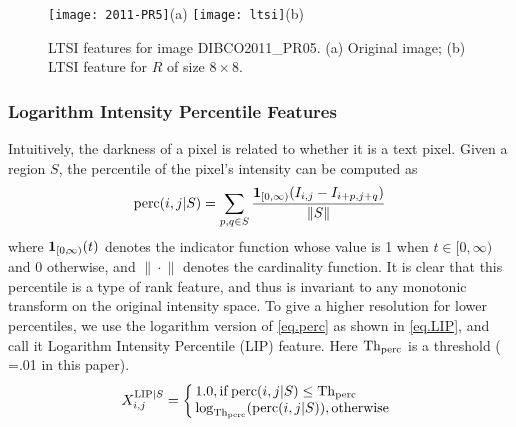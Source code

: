 \documentclass[onecolumn,11pt,draftcls,journal]{IEEEtran}
\newcommand{\im}[1]{{\bf{#1}}}
\def\fwI{.25}
\begin{document}
\begin{figure}[!h]
\centering\scriptsize
\texttt{[image: 2011-PR5]}{(a)}
\texttt{[image: ltsi]}{(b)}
\caption{LTSI features for image DIBCO2011\_PR05. (a) Original image; (b) LTSI feature for $R$ of size $8\times 8$. }\label{fig.ltsi}
\end{figure}

\subsubsection{Logarithm Intensity Percentile Features}
Intuitively, the darkness of a pixel is related to whether it is a text pixel. Given a region $S$, the percentile of the pixel's intensity can be computed as
\begin{equation}{\rm perc}(i,j|S) = \sum_{p,q\in S} {\im{1}_{[0,\infty)}(I_{i,j}- I_{i+p,j+q})\over \|S\|}
\label{eq.perc}
\end{equation}
where $\im{1}_{[0,\!\infty)}(t)$ denotes the indicator function whose value is 1 when $t\!\in\![0\!,\!\infty)$ and 0 otherwise, and $\|\!\cdot\!\|$ denotes the cardinality function. It is clear that this percentile is a type of rank feature, and thus is invariant to any monotonic transform on the original intensity space. To give a higher resolution for lower percentiles, we use the logarithm version of \eqref{eq.perc} as shown in \eqref{eq.LIP}, and call it Logarithm Intensity Percentile (LIP) feature. Here $\rm{Th}_{perc}$ is a threshold ( =.01 in this paper). 
\begin{equation}
X_{i,j}^{{{\rm{LIP}}|S}} =\left\{
\begin{array}{l}
\!\!1.0, {\rm if}\,{\rm perc}(i,j|S)\leq\rm{{Th}_{perc}}\\
\!\!\displaystyle\log_{\rm{{Th}_{perc}}}({\rm perc}(i,j|S) ), {\rm otherwise}
\end{array}
\right.
\label{eq.LIP}
\end{equation}
\end{document}
